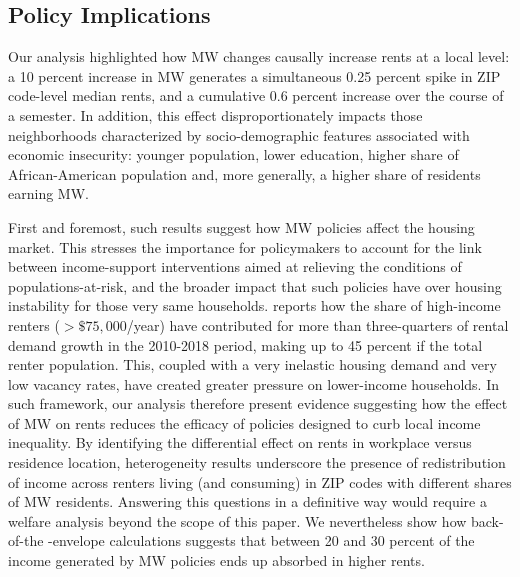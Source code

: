\subsection{Policy Implications}\label{sec:policy}

Our analysis highlighted how MW changes causally increase rents at a local level: a 10 percent
increase in MW generates a simultaneous 0.25 percent spike in ZIP code-level median rents, and 
a cumulative 0.6 percent increase over the course of a semester. In addition, this effect 
disproportionately impacts those neighborhoods characterized by socio-demographic
features associated with economic insecurity: younger population, lower education, 
higher share of African-American population and, more generally, a higher share of residents 
earning MW. 

First and foremost, such results suggest how MW policies affect the housing market. 
This stresses the importance for policymakers to account for the link between 
income-support interventions aimed at relieving the conditions of populations-at-risk, 
and the broader impact that such policies have over housing instability for those very same households.
\textcite{fernald2020americas} reports how the share of high-income renters ($>\$75,000$/year) have contributed for more
than three-quarters of rental demand growth in the 2010-2018 period, making up to 45 percent 
if the total renter population. This, coupled with a very inelastic housing demand and very low 
vacancy rates, have created greater pressure on lower-income households. In such framework, our analysis 
therefore present evidence suggesting how the effect of MW on rents reduces the efficacy of policies designed to 
curb local income inequality. By identifying the differential effect on rents in workplace versus residence location, 
heterogeneity results underscore the presence of redistribution of income across renters living (and consuming) in 
ZIP codes with different shares of MW residents. 
Answering this questions in a definitive way 
would require a welfare analysis beyond the scope of this paper. We nevertheless show how back-of-the
-envelope calculations suggests that between 20 and 30 percent of the income generated by MW policies 
ends up absorbed in higher rents.

